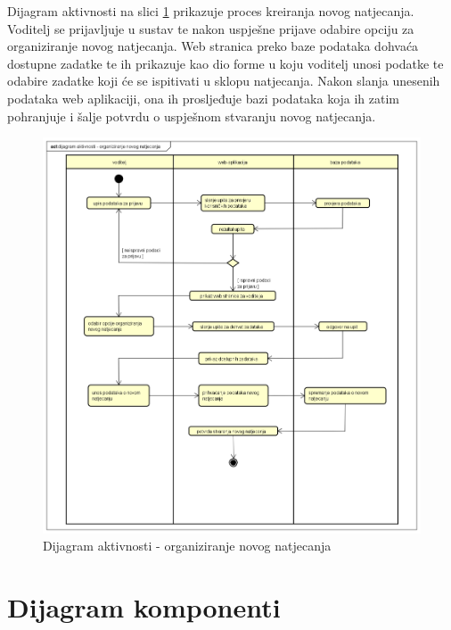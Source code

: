 Dijagram aktivnosti na slici \ref{fig:dijagramAktivnosti} prikazuje proces kreiranja novog natjecanja. Voditelj se prijavljuje u sustav te nakon uspješne prijave odabire opciju za organiziranje novog natjecanja. Web stranica preko baze podataka dohvaća dostupne zadatke te ih prikazuje kao dio forme u koju voditelj unosi podatke te odabire zadatke koji će se ispitivati u sklopu natjecanja. Nakon slanja unesenih podataka web aplikaciji, ona ih prosljeđuje bazi podataka koja ih zatim pohranjuje i šalje potvrdu o uspješnom stvaranju novog natjecanja. 
\\
\begin{figure}[H]
	\includegraphics[scale=0.5]{dijagrami/act_novo_natjecanje.png}
	\centering
	\caption{Dijagram aktivnosti - organiziranje novog natjecanja}
	\label{fig:dijagramAktivnosti}
\end{figure}
%
%
%
\section{Dijagram komponenti}

